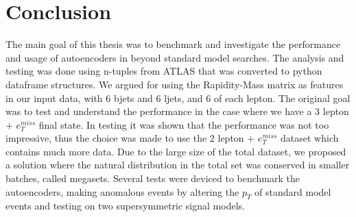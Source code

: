\chapter{Conclusion}


The main goal of this thesis was to benchmark and investigate the performance and usage of
autoencoders in beyond standard model searches. The analysis and testing was done using 
n-tuples from ATLAS that was converted to python dataframe structures. We argued for using 
the Rapidity-Mass matrix as features in our input data, with 6 bjets and 6 ljets, and 6 
of each lepton. The original goal was to test and understand the performance in the case
where we have a 3 lepton + $e_T^{miss}$ final state. In testing it was shown that the 
performance was not too impressive, thus the choice was made to use the 2 lepton + $e_T^{miss}$ dataset which 
contains much more data. Due to the large size of the total dataset, we proposed a solution
where the natural distribution in the total set was conserved in smaller batches, called 
megasets. Several tests were deviced to benchmark the autoencoders, 
making anomalous events by altering the $p_T$ of standard model events and testing on two 
supersymmetric signal models. 